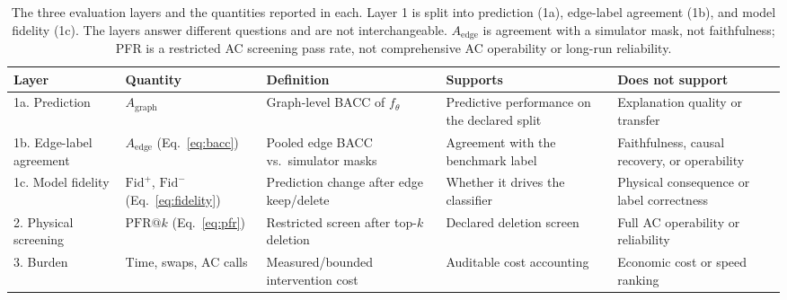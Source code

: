 \begin{table}[!htb]
\centering
\caption{The three evaluation layers and the quantities reported in each. Layer 1 is split into prediction (1a), edge-label agreement (1b), and model fidelity (1c). The layers answer different questions and are not interchangeable. $A_{\mathrm{edge}}$ is agreement with a simulator mask, not faithfulness; PFR is a restricted AC screening pass rate, not comprehensive AC operability or long-run reliability.}
\label{tab:layers}
\begingroup{}
\scriptsize
\setlength{\tabcolsep}{2pt}
\begin{tabularx}{\textwidth}{@{}l>{\raggedright\arraybackslash\hsize=0.9\hsize}X>{\raggedright\arraybackslash\hsize=1.3\hsize}X>{\raggedright\arraybackslash\hsize=0.9\hsize}X>{\raggedright\arraybackslash\hsize=0.9\hsize}X@{}}
\toprule
Layer & Quantity & Definition & Supports & Does not support \\
\midrule
1a. Prediction & $A_{\mathrm{graph}}$ & Graph-level BACC of $f_\theta$ & Predictive performance on the declared split & Explanation quality or transfer \\
1b. Edge-label agreement & $A_{\mathrm{edge}}$ (Eq.~\ref{eq:bacc}) & Pooled edge BACC vs.\ simulator masks & Agreement with the benchmark label & Faithfulness, causal recovery, or operability \\
1c. Model fidelity & $\mathrm{Fid}^{+}$, $\mathrm{Fid}^{-}$ (Eq.~\ref{eq:fidelity}) & Prediction change after edge keep/delete & Whether it drives the classifier & Physical consequence or label correctness \\
2. Physical screening & $\mathrm{PFR@}k$ (Eq.~\ref{eq:pfr}) & Restricted screen after top-$k$ deletion & Declared deletion screen & Full AC operability or reliability \\
3. Burden & Time, swaps, AC calls & Measured/bounded intervention cost & Auditable cost accounting & Economic cost or speed ranking \\
\bottomrule
\end{tabularx}
\endgroup
\end{table}

